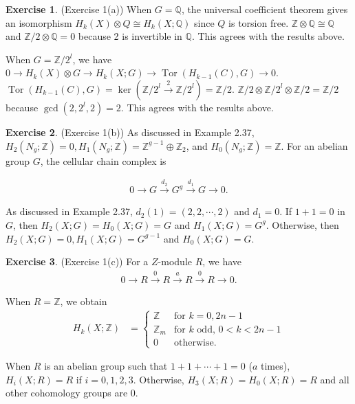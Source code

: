 \documentclass[12pt, psamsfonts]{amsart}
\theoremstyle{definition}
\newtheorem*{exer}{Exercise}
\theoremstyle{remark}
\DeclareMathOperator{\Tor}{Tor}
\numberwithin{equation}{section}
\begin{document}
\begin{exer}{(Exercise 1(a))}
  When $G = \mathbb{Q}$, the universal coefficient theorem gives an isomorphism $H_k(X) \otimes Q \cong H_k(X; \mathbb{Q})$ since $Q$ is torsion free.
  $\mathbb{Z} \otimes \mathbb{Q} \cong \mathbb{Q}$ and $\mathbb{Z} / 2 \otimes \mathbb{Q} = 0$ because 2 is invertible in $\mathbb{Q}$.
  This agrees with the results above.

  When $G = \mathbb{Z} / 2^l$, we have $0 \rightarrow H_k(X) \otimes G \rightarrow H_k(X; G) \rightarrow \Tor(H_{k - 1}(C), G) \rightarrow 0$.
  $\Tor(H_{k - 1}(C), G) = \ker(\mathbb{Z} / 2^l \xrightarrow{2} \mathbb{Z} / 2^l) = \mathbb{Z} / 2$.
  $\mathbb{Z} / 2 \otimes \mathbb{Z} / 2^l \otimes \mathbb{Z} / 2 = \mathbb{Z} / 2$ because $\gcd(2, 2^l, 2) = 2$.
  This agrees with the results above.
\end{exer}

\begin{exer}{(Exercise 1(b))}
  As discussed in Example 2.37, $H_2(N_g; \mathbb{Z}) = 0, H_1(N_g; \mathbb{Z}) = \mathbb{Z}^{g - 1} \oplus \mathbb{Z}_2$, and $H_0(N_g; \mathbb{Z}) = \mathbb{Z}$.
  For an abelian group $G$, the cellular chain complex is

  \begin{align*}
    0 \rightarrow G \xrightarrow{d_2} G^g \xrightarrow{d_1} G \rightarrow 0.
  \end{align*}

  As discussed in Example 2.37, $d_2(1) = (2, 2, \cdots, 2)$ and $d_1 = 0$.
  If $1 + 1 = 0$ in $G$, then $H_2(X; G) = H_0(X; G) = G$ and $H_1(X; G) = G^g$.
  Otherwise, then $H_2(X; G) = 0, H_1(X; G) = G^{g - 1}$ and $H_0(X; G) = G$.
\end{exer}

\begin{exer}{(Exercise 1(c))}
  For a $Z$-module $R$, we have
  \begin{align*}
    0 \rightarrow R \xrightarrow{0} R \xrightarrow{a} R \xrightarrow{0} R \rightarrow 0.
  \end{align*}

  When $R = \mathbb{Z}$, we obtain
  \begin{align*}
    H_k(X; \mathbb{Z}) &= \begin{cases}
      \mathbb{Z} & \text{for $k = 0, 2n - 1$} \\
      \mathbb{Z}_m & \text{for $k$ odd, $0 < k < 2n - 1$} \\
      0 & \text{otherwise}.
    \end{cases}
  \end{align*}

  When $R$ is an abelian group such that $1 + 1 + \cdots + 1 = 0$ ($a$ times), $H_i(X; R) = R$ if $i = 0, 1, 2, 3$.
  Otherwise, $H_3(X; R) = H_0(X; R) = R$ and all other cohomology groups are 0.
\end{exer}
\end{document}
